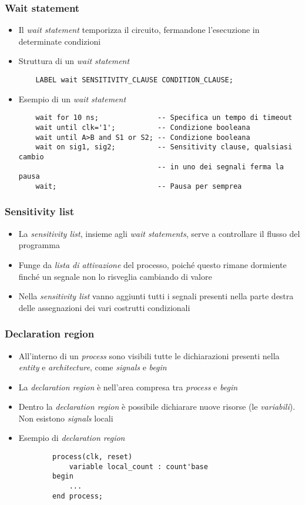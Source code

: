 \documentclass{article}
\begin{document}
\subsubsection{Wait statement}
\begin{itemize}
	\item Il \textit{wait statement} temporizza il circuito, fermandone l'esecuzione in determinate condizioni
	\item Struttura di un \textit{wait statement}
	      \begin{verbatim}
    LABEL wait SENSITIVITY_CLAUSE CONDITION_CLAUSE;
	      \end{verbatim}
	      \bigskip
	      \bigskip
	\item Esempio di un \textit{wait statement}
	      \begin{verbatim}
    wait for 10 ns;              -- Specifica un tempo di timeout
    wait until clk='1';          -- Condizione booleana
    wait until A>B and S1 or S2; -- Condizione booleana
    wait on sig1, sig2;          -- Sensitivity clause, qualsiasi cambio
                                 -- in uno dei segnali ferma la pausa
    wait;                        -- Pausa per semprea
	      \end{verbatim} 
\end{itemize}
\subsubsection{Sensitivity list}
\begin{itemize}
	\item La \textit{sensitivity list}, insieme agli \textit{wait statements}, serve a controllare il flusso del programma
	\item Funge da \textit{lista di attivazione} del processo, poiché questo rimane dormiente finché un segnale non lo risveglia cambiando di valore
	\item Nella \textit{sensitivity list} vanno aggiunti tutti i segnali presenti nella parte destra delle assegnazioni dei vari costrutti condizionali
\end{itemize}
\subsubsection{Declaration region}
\begin{itemize}
	\item All'interno di un \textit{process} sono visibili tutte le dichiarazioni presenti nella \textit{entity} e \textit{architecture}, come \textit{signals} e \textit{begin}
	\item La \textit{declaration region} è nell'area compresa tra \textit{process} e \textit{begin}
	\item Dentro la \textit{declaration region} è possibile dichiarare nuove risorse (le \textit{variabili}). Non esistono \textit{signals} locali
	\item Esempio di \textit{declaration region}
	      \begin{verbatim}
	    process(clk, reset)
	        variable local_count : count'base
	    begin
        	...
	    end process;
	      \end{verbatim}
\end{itemize}
\end{document}

